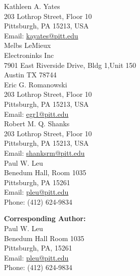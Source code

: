 \documentclass[12pt]{letter}
\begin{document}
Kathleen A. Yates\\
 203 Lothrop Street, Floor 10\\
Pittsburgh, PA 15213, USA\\
Email:  \href{mailto:kayates@pitt.edu}{kayates@pitt.edu}\\

Melbs LeMieux \\
Electroninks Inc \\ 
7901 East Riverside Drive, Bldg 1,Unit 150\\
Austin TX  78744 \\

Eric G. Romanowski\\
 203 Lothrop Street, Floor 10\\
Pittsburgh, PA 15213, USA\\
Email:  \href{mailto:egr1@pitt.edu}{egr1@pitt.edu}\\

Robert M. Q. Shanks\\
 203 Lothrop Street, Floor 10\\
Pittsburgh, PA 15213, USA\\
Email:  \href{mailto:shanksrm@pitt.edu}{shanksrm@pitt.edu}\\

Paul W. Leu\\
Benedum Hall, Room 1035 \\
Pittsburgh, PA 15261\\
Email:  \href{mailto:pleu@pitt.edu}{pleu@pitt.edu}\\
Phone: (412) 624-9834

\textbf{Corresponding Author:}\\
Paul W. Leu\\
Benedum Hall Room 1035 \\
Pittsburgh, PA, 15261\\
Email:  \href{mailto:pleu@pitt.edu}{pleu@pitt.edu}\\
Phone: (412) 624-9834





%
%
\end{document}
